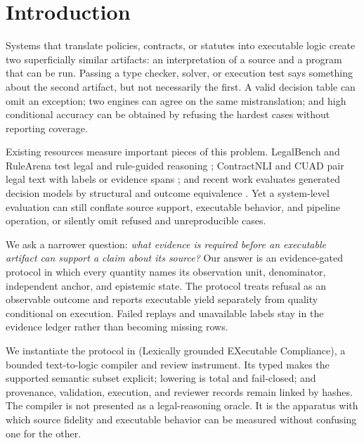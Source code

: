 \section{Introduction}

Systems that translate policies, contracts, or statutes into executable logic
create two superficially similar artifacts: an interpretation of a source and a
program that can be run. Passing a type checker, solver, or execution test says
something about the second artifact, but not necessarily the first. A valid
decision table can omit an exception; two engines can agree on the same
mistranslation; and high conditional accuracy can be obtained by refusing the
hardest cases without reporting coverage.

Existing resources measure important pieces of this problem. LegalBench and
RuleArena test legal and rule-guided reasoning
\citep{guha2023legalbench,zhou2025rulearena}; ContractNLI and CUAD pair legal
text with labels or evidence spans \citep{koreeda2021contractnli,hendrycks2021cuad};
and recent work evaluates generated decision models by structural and outcome
equivalence \citep{graus2026legaltext}. Yet a system-level evaluation can
still conflate source support, executable behavior, and pipeline operation, or
silently omit refused and unreproducible cases.

We ask a narrower question: \emph{what evidence is required before an
executable artifact can support a claim about its source?} Our answer is an
evidence-gated protocol in which every quantity names its observation unit,
denominator, independent anchor, and epistemic state. The protocol treats
refusal as an observable outcome and reports executable yield separately from
quality conditional on execution. Failed replays and unavailable labels stay
in the evidence ledger rather than becoming missing rows.

We instantiate the protocol in \lexec{} (Lexically grounded EXecutable
Compliance), a bounded text-to-logic compiler and review instrument. Its typed
\lexir{} makes the supported semantic subset explicit; lowering is total and
fail-closed; and provenance, validation, execution, and reviewer records remain
linked by hashes. The compiler is not presented as a legal-reasoning oracle. It
is the apparatus with which source fidelity and executable behavior can be
measured without confusing one for the other.


